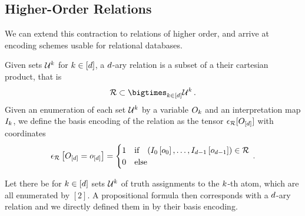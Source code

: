 \subsection{Higher-Order Relations}

We can extend this contraction to relations of higher order, and arrive at encoding schemes usable for relational databases.

\begin{definition}
    \label{def:daryRelation}
    Given sets $\mathcal{U}^{k}$ for $k\in[d]$, a $d$-ary relation is a subset of a their cartesian product, that is
    \begin{align*}
        \exrelation \subset\bigtimes_{\atomenumeratorin} \arbsetof{\atomenumerator} \, .
    \end{align*}
    Given an enumeration of each set $\mathcal{U}^{k}$ by a variable $O_{k}$ and an interpretation map $I_{k}$, we define the basis encoding of the relation as the tensor $\epsilon_{\mathcal{R}}[O_{[d]}]$ with coordinates
    \begin{align*}
        \epsilon_{\mathcal{R}}\left[O_{[d]}=o_{[d]}\right]
        = \begin{cases}
              1 & \text{if}\quad (I_{0}\left[o_{0}\right],\ldots,I_{d-1}\left[o_{d-1}\right]) \in \mathcal{R} \\
              0 & \text{else}
        \end{cases} \, .
    \end{align*}
\end{definition}

Let there be for $k\in[d]$ sets $\mathcal{U}^{k}$ of truth assignments to the $k$-th atom, which are all enumerated by $[2]$.
A propositional formula then corresponds with a $d$-ary relation and we directly defined them in  by their basis encoding.


